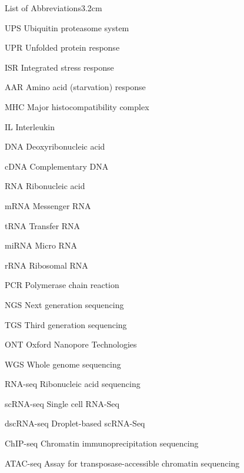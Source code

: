 \begin{mclistof}{List of Abbreviations}{3.2cm}
\item[UPS] Ubiquitin proteasome system

\item[UPR] Unfolded protein response

\item[ISR] Integrated stress response

\item[AAR] Amino acid (starvation) response

\item[MHC] Major histocompatibility complex

\item[IL] Interleukin

\item[DNA] Deoxyribonucleic acid

\item[cDNA] Complementary DNA

\item[RNA] Ribonucleic acid

\item[mRNA] Messenger RNA

\item[tRNA] Transfer RNA

\item[miRNA] Micro RNA

\item[rRNA] Ribosomal RNA

\item[PCR] Polymerase chain reaction

\item[NGS] Next generation sequencing

\item[TGS] Third generation sequencing

\item[ONT] Oxford Nanopore Technologies

\item[WGS] Whole genome sequencing

\item[RNA-seq] Ribonucleic acid sequencing

\item[scRNA-seq] Single cell RNA-Seq

\item[dscRNA-seq] Droplet-based scRNA-Seq

\item[ChIP-seq] Chromatin immunoprecipitation sequencing

\item[ATAC-seq] Assay for transposase-accessible chromatin sequencing


\end{mclistof}
